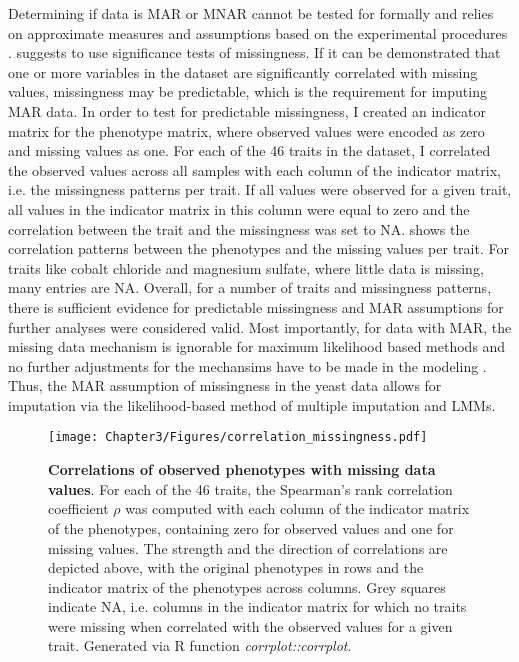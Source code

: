 Determining if data is MAR or MNAR cannot be tested for formally and relies on approximate measures and assumptions based on the experimental procedures \citep{Schafer2002,Garson2015,Templ2012}. \citet{Garson2015} suggests to use significance tests of missingness. If it can be demonstrated that one or more variables in the dataset are significantly correlated with missing values, missingness may be predictable, which is the requirement for imputing MAR data. In order to test for predictable missingness, I created an indicator matrix for the phenotype matrix, where observed values were encoded as zero and missing values as one. For each of the \num{46} traits in the dataset, I correlated the observed values across all samples with each column of the indicator matrix, i.e. the missingness patterns per trait. If all values were observed for a given trait, all values in the indicator matrix in this column were equal to zero and the correlation between the trait and the missingness was set to NA.  shows the correlation patterns between the phenotypes and the missing values per trait. For traits like cobalt chloride and magnesium sulfate, where little data is missing, many entries are NA. Overall, for a number of traits and missingness patterns, there is sufficient evidence for predictable missingness and MAR assumptions for further analyses were considered valid. Most importantly, for data with MAR, the missing data mechanism is ignorable for maximum likelihood based methods and no further adjustments for the mechansims have to be made in the modeling \citep{Rubin1976,Little1988}. Thus, the MAR assumption of missingness in the yeast data allows for imputation via the likelihood-based method of multiple imputation and LMMs.


\begin{figure}[hbtp]
	\centering
	\texttt{[image: Chapter3/Figures/correlation\_missingness.pdf]}
	\caption[\textbf{Correlations of observed phenotypes with missing data values.}]{\textbf{Correlations of observed phenotypes with missing data values}. For each of the \num{46} traits, the Spearman's rank correlation coefficient \(\rho\) was computed with each column of the indicator matrix of the phenotypes, containing zero for observed values and one for missing values. The strength and the direction of correlations are depicted above, with the original phenotypes in rows and the indicator matrix of the phenotypes across columns.  Grey squares indicate NA, i.e. columns in the indicator matrix for which no traits were missing when correlated with the observed values for a given trait. Generated via R function \textit{corrplot::corrplot}.}
 	\label{fig:missingnesscorrelations}
\end{figure}

